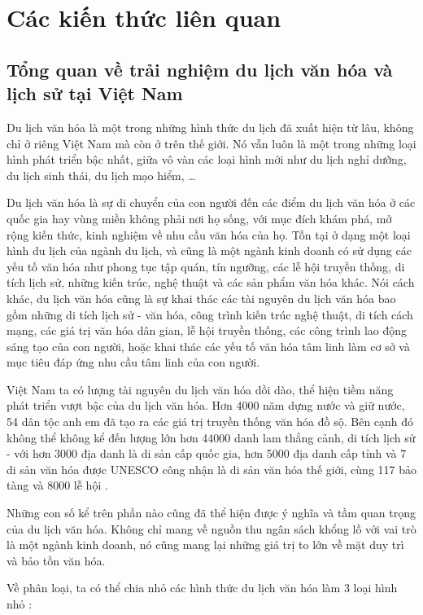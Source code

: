 \chapter{Các kiến thức liên quan}

\section{Tổng quan về trải nghiệm du lịch văn hóa và lịch sử tại Việt Nam}
Du lịch văn hóa là một trong những hình thức du lịch đã xuất hiện từ lâu, không
chỉ ở riêng Việt Nam mà còn ở trên thế giới. Nó vẫn luôn là một trong những loại
hình phát triển bậc nhất, giữa vô vàn các loại hình mới như du lịch nghỉ dưỡng, du
lịch sinh thái, du lịch mạo hiểm, …

Du lịch văn hóa là sự di chuyển của con người đến các điểm du lịch văn hóa ở
các quốc gia hay vùng miền không phải nơi họ sống, với mục đích khám phá, mở
rộng kiến thức, kinh nghiệm về nhu cầu văn hóa của họ. Tồn tại ở dạng một loại hình
du lịch của ngành du lịch, và cũng là một ngành kinh doanh có sử dụng các yếu tố
văn hóa như phong tục tập quán, tín ngưỡng, các lễ hội truyền thống, di tích lịch sử,
những kiến trúc, nghệ thuật và các sản phẩm văn hóa khác. Nói cách khác, du lịch
văn hóa cũng là sự khai thác các tài nguyên du lịch văn hóa bao gồm những di tích
lịch sử - văn hóa, công trình kiến trúc nghệ thuật, di tích cách mạng, các giá trị văn
hóa dân gian, lễ hội truyền thống, các công trình lao động sáng tạo của con người,
hoặc khai thác các yếu tố văn hóa tâm linh làm cơ sở và mục tiêu đáp ứng nhu cầu
tâm linh của con người.

Việt Nam ta có lượng tài nguyên du lịch văn hóa dồi dào, thể hiện tiềm năng
phát triển vượt bậc của du lịch văn hóa. Hơn 4000 năm dựng nước và giữ nước, 54
dân tộc anh em đã tạo ra các giá trị truyền thống văn hóa đồ sộ. Bên cạnh đó không
thể không kể đến lượng lớn hơn 44000 danh lam thắng cảnh, di tích lịch sử - với hơn
3000 địa danh là di sản cấp quốc gia, hơn 5000 địa danh cấp tỉnh và 7 di sản văn hóa
được UNESCO công nhận là di sản văn hóa thế giới, cùng 117 bảo tàng và 8000 lễ
hội \cite{huong2022}.

Những con số kể trên phần nào cũng đã thể hiện được ý nghĩa và tầm quan trọng
của du lịch văn hóa. Không chỉ mang về nguồn thu ngân sách khổng lồ với vai trò là
một ngành kinh doanh, nó cũng mang lại những giá trị to lớn về mặt duy trì và bảo
tồn văn hóa.

Về phân loại, ta có thể chia nhỏ các hình thức du lịch văn hóa làm 3 loại hình
nhỏ \cite{vinpearl2022}:

